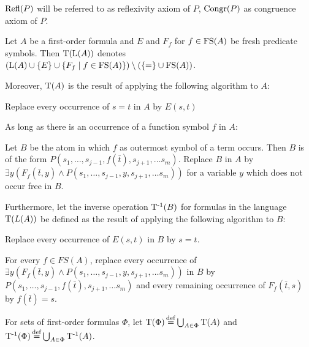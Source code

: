 $\operatorname{Refl}(P)$ will be referred to as reflexivity axiom of $P$, $\operatorname{Congr}(P)$ as congruence axiom of $P$.

\begin{defi}[label=exa:cont]
	\label{def:trans}
	Let $A$ be a first-order formula and $E$ and $F_f$ for $f \in \operatorname{FS}(A)$ be fresh predicate symbols.
	Then $\operatorname{T}(\operatorname{L}(A))$ denotes $(\Lang(A)\cup \{E\}\cup\{F_f\mid f \in \FS(A)\}) \setminus(\{=\nolinebreak \} \cup\nolinebreak \FS(A))$.

	Moreover, $\operatorname{T}(A)$ is the result of applying the following algorithm to $A$:

	\begin{compactenum}
	\item Replace every occurrence of $s=t$ in $A$ by $E(s, t)$
	\label{def:trans_step1}
	\item As long as there is an occurrence of a function symbol $f$ in $A$:
	\label{def:trans_step2}

		Let $B$ be the atom in which $f$ as outermost symbol of a term occurs.
		Then $B$ is of the form $P(s_1, \ldots, s_{j-1}, f(\bar t),\allowbreak s_{j+1}, \ldots s_m)$.
		Replace $B$ in $A$ by $\exists y (F_f(\bar t, y) \land P(s_1, \ldots, s_{j-1}, y, s_{j+1}, \ldots s_m))$ for a variable $y$ which does not occur free in $B$.
	\end{compactenum}

	Furthermore, let the inverse operation $\operatorname{T^{-1}}(B)$ for formulas in the language $\operatorname{T}(L(A))$ be defined as the result of applying the following algorithm to $B$:
	\begin{compactenum}
	\item Replace every occurrence of $E(s, t)$ in $B$ by $s=t$.
	\item For every $f \in FS(A)$, replace every occurrence of 
		$\exists y (F_f(\bar t, y) \land P(s_1, \ldots, s_{j-1},\allowbreak y,\allowbreak s_{j+1}, \ldots s_m))$
		in $B$ by $P(s_1, \ldots, s_{j-1},\allowbreak f(\bar t),\allowbreak s_{j+1}, \ldots s_m)$ and every remaining occurrence of $F_f(\bar t, s)$ by $f(\bar t) = s$.
	\end{compactenum}

	For sets of first-order formulas $\Phi$, let $\operatorname{T}(\Phi) \operatorname{\stackrel{\mathrm{def}}{=}} \bigcup_{A\in\Phi} \operatorname{T}(A)$ and 
$\operatorname{T^{-1}}(\Phi) \operatorname{\stackrel{\mathrm{def}}{=}} \bigcup_{A\in\Phi} \operatorname{T^{-1}}(A)$.
\end{defi}

